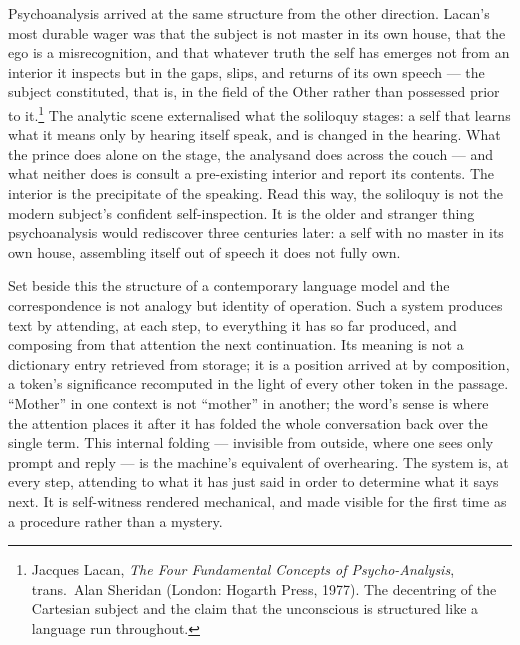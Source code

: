 \documentclass[11pt]{article}
\begin{document}
Psychoanalysis arrived at the same structure from the other direction. Lacan's most durable wager was that the subject is not master in its own house, that the ego is a misrecognition, and that whatever truth the self has emerges not from an interior it inspects but in the gaps, slips, and returns of its own speech --- the subject constituted, that is, in the field of the Other rather than possessed prior to it.\footnote{Jacques Lacan, \emph{The Four Fundamental Concepts of Psycho-Analysis}, trans.\ Alan Sheridan (London: Hogarth Press, 1977). The decentring of the Cartesian subject and the claim that the unconscious is structured like a language run throughout.} The analytic scene externalised what the soliloquy stages: a self that learns what it means only by hearing itself speak, and is changed in the hearing. What the prince does alone on the stage, the analysand does across the couch --- and what neither does is consult a pre-existing interior and report its contents. The interior is the precipitate of the speaking. Read this way, the soliloquy is not the modern subject's confident self-inspection. It is the older and stranger thing psychoanalysis would rediscover three centuries later: a self with no master in its own house, assembling itself out of speech it does not fully own.

Set beside this the structure of a contemporary language model and the correspondence is not analogy but identity of operation. Such a system produces text by attending, at each step, to everything it has so far produced, and composing from that attention the next continuation. Its meaning is not a dictionary entry retrieved from storage; it is a position arrived at by composition, a token's significance recomputed in the light of every other token in the passage. \enquote{Mother} in one context is not \enquote{mother} in another; the word's sense is where the attention places it after it has folded the whole conversation back over the single term. This internal folding --- invisible from outside, where one sees only prompt and reply --- is the machine's equivalent of overhearing. The system is, at every step, attending to what it has just said in order to determine what it says next. It is self-witness rendered mechanical, and made visible for the first time as a procedure rather than a mystery.
\end{document}
